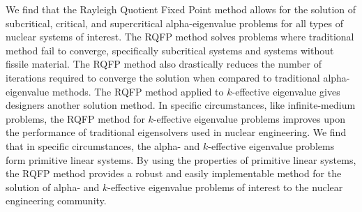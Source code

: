 We find that the Rayleigh Quotient Fixed Point method allows for the solution of subcritical, critical, and supercritical alpha-eigenvalue problems for all types of nuclear systems of interest. The RQFP method solves problems where traditional method fail to converge, specifically subcritical systems and systems without fissile material. The RQFP method also drastically reduces the number of iterations required to converge the solution when compared to traditional alpha-eigenvalue methods. The RQFP method applied to $k$-effective eigenvalue gives designers another solution method. In specific circumstances, like infinite-medium problems, the RQFP method for $k$-effective eigenvalue problems improves upon the performance of traditional eigensolvers used in nuclear engineering. We find that in specific circumstances, the alpha- and $k$-effective eigenvalue problems form primitive linear systems. By using the properties of primitive linear systems, the RQFP method provides a robust and easily implementable method for the solution of alpha- and $k$-effective eigenvalue problems of interest to the nuclear engineering community.